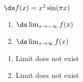 {$\ds f(x) = x^2\sin (\pi x)$

\begin{enumerate}
\item		$\ds \lim_{x\to -\infty} f(x)$
\item		$\ds \lim_{x\to \infty} f(x)$
\end{enumerate}

}
{\begin{enumerate}
\item	Limit does not exist
\item	Limit does not exist
\end{enumerate}
}
